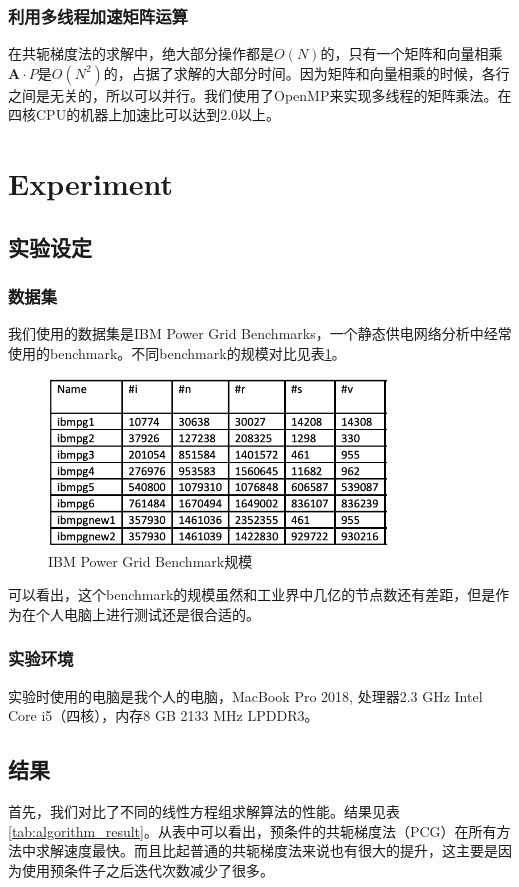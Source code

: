 \documentclass[UTF8,11pt]{report}
\begin{document}
\subsubsection{利用多线程加速矩阵运算}
在共轭梯度法的求解中，绝大部分操作都是$O(N)$的，只有一个矩阵和向量相乘$\mathbf{A}\cdot{P}$是$O(N^2)$的，占据了求解的大部分时间。因为矩阵和向量相乘的时候，各行之间是无关的，所以可以并行。我们使用了OpenMP来实现多线程的矩阵乘法。在四核CPU的机器上加速比可以达到2.0以上。
\section{Experiment}
\subsection{实验设定}
\subsubsection{数据集}
我们使用的数据集是IBM Power Grid Benchmarks\cite{4483978}，一个静态供电网络分析中经常使用的benchmark。不同benchmark的规模对比见表\ref{tab:dataset}。
\begin{figure}[!ht]
	\centering
	\includegraphics[width=0.8\textwidth]{dataset}
	\caption{IBM Power Grid Benchmark规模}
	\label{tab:dataset}
\end{figure}

可以看出，这个benchmark的规模虽然和工业界中几亿的节点数还有差距，但是作为在个人电脑上进行测试还是很合适的。

\subsubsection{实验环境}
实验时使用的电脑是我个人的电脑，MacBook Pro 2018, 处理器2.3 GHz Intel Core i5（四核），内存8 GB 2133 MHz LPDDR3。

\subsection{结果}
首先，我们对比了不同的线性方程组求解算法的性能。结果见表\ref{tab:algorithm_result}。从表中可以看出，预条件的共轭梯度法（PCG）在所有方法中求解速度最快。而且比起普通的共轭梯度法来说也有很大的提升，这主要是因为使用预条件子之后迭代次数减少了很多。
\end{document}
